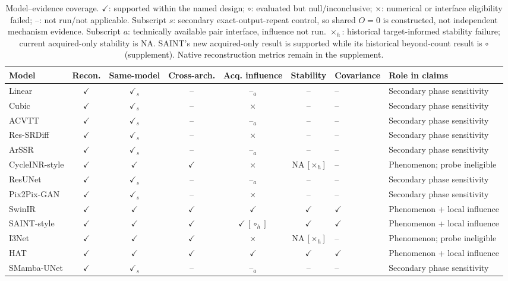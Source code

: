 \begin{table}[t]\centering\footnotesize
\caption{Model--evidence coverage. $\checkmark$: supported within the named design; $\circ$: evaluated but null/inconclusive; $\times$: numerical or interface eligibility failed; --: not run/not applicable. Subscript $s$: secondary exact-output-repeat control, so shared $O=0$ is constructed, not independent mechanism evidence. Subscript $a$: technically available pair interface, influence not run. $\times_h$: historical target-informed stability failure; current acquired-only stability is NA. SAINT's new acquired-only result is supported while its historical beyond-count result is $\circ$ (supplement). Native reconstruction metrics remain in the supplement.}
\label{tab:coverage}\setlength{\tabcolsep}{3pt}
\begin{tabular}{lcccccll}\toprule
Model & Recon. & Same-model & Cross-arch. & Acq. influence & Stability & Covariance & Role in claims\\\midrule
Linear & $\checkmark$ & $\checkmark_s$ & -- & --$_a$ & -- & -- & Secondary phase sensitivity \\
Cubic & $\checkmark$ & $\checkmark_s$ & -- & $\times$ & -- & -- & Secondary phase sensitivity \\
ACVTT & $\checkmark$ & $\checkmark_s$ & -- & --$_a$ & -- & -- & Secondary phase sensitivity \\
Res-SRDiff & $\checkmark$ & $\checkmark_s$ & -- & $\times$ & -- & -- & Secondary phase sensitivity \\
ArSSR & $\checkmark$ & $\checkmark_s$ & -- & --$_a$ & -- & -- & Secondary phase sensitivity \\
CycleINR-style & $\checkmark$ & $\checkmark$ & $\checkmark$ & $\times$ & NA [$\times_h$] & -- & Phenomenon; probe ineligible \\
ResUNet & $\checkmark$ & $\checkmark_s$ & -- & --$_a$ & -- & -- & Secondary phase sensitivity \\
Pix2Pix-GAN & $\checkmark$ & $\checkmark_s$ & -- & $\times$ & -- & -- & Secondary phase sensitivity \\
SwinIR & $\checkmark$ & $\checkmark$ & $\checkmark$ & $\checkmark$ & $\checkmark$ & $\checkmark$ & Phenomenon + local influence \\
SAINT-style & $\checkmark$ & $\checkmark$ & $\checkmark$ & $\checkmark\,[\circ_h]$ & $\checkmark$ & $\checkmark$ & Phenomenon + local influence \\
I3Net & $\checkmark$ & $\checkmark$ & $\checkmark$ & $\times$ & NA [$\times_h$] & -- & Phenomenon; probe ineligible \\
HAT & $\checkmark$ & $\checkmark$ & $\checkmark$ & $\checkmark$ & $\checkmark$ & $\checkmark$ & Phenomenon + local influence \\
SMamba-UNet & $\checkmark$ & $\checkmark_s$ & -- & --$_a$ & -- & -- & Secondary phase sensitivity \\\bottomrule\end{tabular}\end{table}